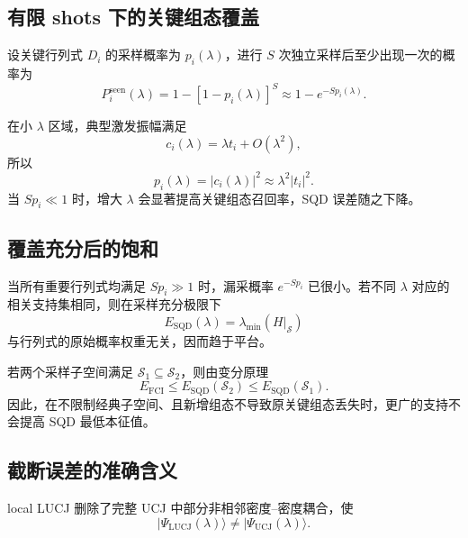 \documentclass[UTF8,12pt,a4paper]{ctexart}
\begin{document}
\subsection{有限 shots 下的关键组态覆盖}

设关键行列式 $D_i$ 的采样概率为 $p_i(\lambda)$，进行 $S$ 次独立采样后至少出现一次的概率为
\begin{equation}
P_i^{\mathrm{seen}}(\lambda)
=1-[1-p_i(\lambda)]^S
\approx1-e^{-S p_i(\lambda)}.
\label{eq:seen}
\end{equation}

在小 $\lambda$ 区域，典型激发振幅满足
\begin{equation}
c_i(\lambda)=\lambda t_i+O(\lambda^2),
\end{equation}
所以
\begin{equation}
p_i(\lambda)=|c_i(\lambda)|^2
\approx\lambda^2|t_i|^2.
\label{eq:p_lambda}
\end{equation}
当 $S p_i\ll1$ 时，增大 $\lambda$ 会显著提高关键组态召回率，SQD 误差随之下降。

\subsection{覆盖充分后的饱和}

当所有重要行列式均满足 $S p_i\gg1$ 时，漏采概率 $e^{-S p_i}$ 已很小。若不同 $\lambda$ 对应的相关支持集相同，则在采样充分极限下
\begin{equation}
E_{\mathrm{SQD}}(\lambda)
=\lambda_{\min}(H|_{\mathcal S})
\end{equation}
与行列式的原始概率权重无关，因而趋于平台。

若两个采样子空间满足 $\mathcal S_1\subseteq\mathcal S_2$，则由变分原理
\begin{equation}
E_{\mathrm{FCI}}
\le E_{\mathrm{SQD}}(\mathcal S_2)
\le E_{\mathrm{SQD}}(\mathcal S_1).
\label{eq:variational}
\end{equation}
因此，在不限制经典子空间、且新增组态不导致原关键组态丢失时，更广的支持不会提高 SQD 最低本征值。

\subsection{截断误差的准确含义}

local LUCJ 删除了完整 UCJ 中部分非相邻密度--密度耦合，使
\begin{equation}
|\Psi_{\mathrm{LUCJ}}(\lambda)\rangle
\ne |\Psi_{\mathrm{UCJ}}(\lambda)\rangle.
\end{equation}
\end{document}
